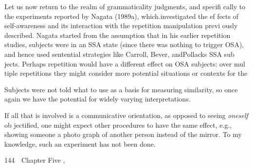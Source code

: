\begin{styleStandard}
Let us now return to the realm of grammaticality judgments, and specifi\- cally to the experiments reported by Nagata (1989a), which.investigated the ef\- fects of self-awareness and its interaction with the repetition manipulation previ\- ously described. Nagata started from the assumption that in his earlier repetition studies, subjects were in an SSA state (since there was nothing to trigger OSA), and hence used sentential strategies like Carroll, Bever, andPollack{\textquotesingle}s SSA sub\- jects. Perhaps repetition would have a different effect on OSA subjects: over mul\- tiple repetitions they might consider more potential situations or contexts for the
\end{styleStandard}


\setcounter{listWWNumxxxiileveli}{5}
\begin{listWWNumxxxiileveli}
\item 
\begin{styleStandard}
Subjects were not told what to use as a basis for measuring similarity, so once again we have the potential for widely varying interpretations.
\end{styleStandard}


\item 
\begin{styleStandard}
If all that is involved is a communicative orientation, as opposed to seeing \textit{oneself}\textit{ }ob\- jectified, one might expect other procedures to have the same effect, e.g., showing someone a photo\- graph of another person instead of the mirror. To my knowledge, such an experiment has not been done.
\end{styleStandard}


\end{listWWNumxxxiileveli}
\clearpage\setcounter{page}{1}\begin{styleStandard}
144\ \ Chapter Five ,
\end{styleStandard}


